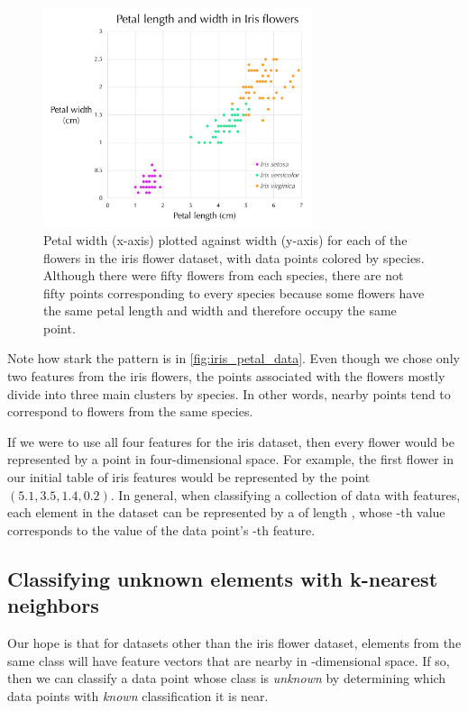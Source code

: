 \begin{figure}[h]
\centering
\mySfFamily
\includegraphics[width = 0.7\textwidth]{../images/iris_petal_data.png}
\caption{Petal width (x-axis) plotted against width (y-axis) for each of the flowers in the iris flower dataset, with data points colored by species. Although there were fifty flowers from each species, there are not fifty points corresponding to every species because some flowers have the same petal length and width and therefore occupy the same point.}
\label{fig:iris_petal_data}
\end{figure}

Note how stark the pattern is in \autoref{fig:iris_petal_data}. Even though we chose only two features from the iris flowers, the points associated with the flowers mostly divide into three main clusters by species. In other words, nearby points tend to correspond to flowers from the same species.

If we were to use all four features for the iris dataset, then every flower would be represented by a point in four-dimensional space. For example, the first flower in our initial table of iris features would be represented by the point $(5.1, 3.5, 1.4, 0.2)$. In general, when classifying a collection of data with  features, each element in the dataset can be represented by a  of length , whose -th value corresponds to the value of the data point's -th feature.

\FloatBarrier
{}
\subsection{Classifying unknown elements with k-nearest neighbors}

Our hope is that for datasets other than the iris flower dataset, elements from the same class will have feature vectors that are nearby in -dimensional space. If so, then we can classify a data point whose class is \textit{unknown} by determining which data points with \textit{known} classification it is near.\\

